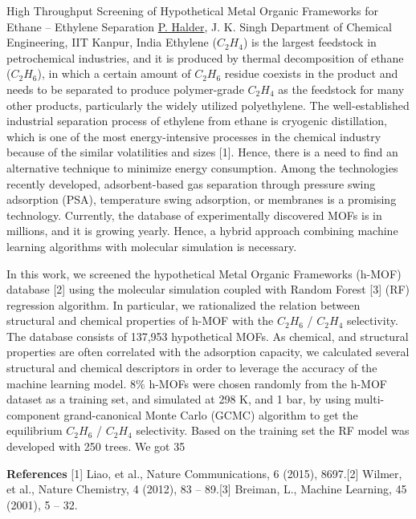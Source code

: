 
    \begin{abstract_online}{High Throughput Screening of Hypothetical Metal Organic Frameworks for Ethane – Ethylene Separation}{%
        \underline{P. Halder}, J. K. Singh}{%
        }{%
        Department of Chemical Engineering, IIT Kanpur, India}
    Ethylene ($C_2H_4$) is the largest feedstock in petrochemical industries, and it is produced by thermal decomposition of ethane ($C_2H_6$), in which a certain amount of $C_2H_6$ residue coexists in the product and needs to be separated to produce polymer-grade $C_2H_4$ as the feedstock for many other products, particularly the widely utilized polyethylene. The well-established industrial separation process of ethylene from ethane is cryogenic distillation, which is one of the most energy-intensive processes in the chemical industry because of the similar volatilities and sizes [1]. Hence, there is a need to find an alternative technique to minimize energy consumption. Among the technologies recently developed, adsorbent-based gas separation through pressure swing adsorption (PSA), temperature swing adsorption, or membranes is a promising technology. Currently, the database of experimentally discovered MOFs is in millions, and it is growing yearly. Hence, a hybrid approach combining machine learning algorithms with molecular simulation is necessary. \par  In this work, we screened the hypothetical Metal Organic Frameworks (h-MOF) database [2] using the molecular simulation coupled with Random Forest [3] (RF) regression algorithm. In particular, we rationalized the relation between structural and chemical properties of h-MOF with the $C_2H_6$ / $C_2H_4$ selectivity. The database consists of 137,953 hypothetical MOFs. As chemical, and structural properties are often correlated with the adsorption capacity, we calculated several structural and chemical descriptors in order to leverage the accuracy of the machine learning model. $8 \%$ h-MOFs were chosen randomly from the h-MOF dataset as a training set, and simulated at 298 K, and 1 bar, by using multi-component grand-canonical Monte Carlo (GCMC) algorithm to get the equilibrium $C_2H_6$ / $C_2H_4$ selectivity. Based on the training set the RF model was developed with 250 trees. We got 35%
    
        \textbf{References} \newline{}[1] Liao, et al., Nature Communications, 6 (2015), 8697.\newline{}[2] Wilmer, et al., Nature Chemistry, 4 (2012), 83 – 89.\newline{}[3] Breiman, L., Machine Learning, 45 (2001), 5 – 32.
    \end{abstract_online}
    